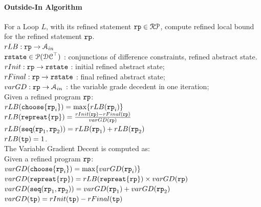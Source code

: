 \paragraph*{Outside-In Algorithm}
For a Loop $L$, with its refined statement $\mathtt{rp} \in \mathcal{RP}$,
compute refined local bound for the refined statement $\mathtt{rp}$.
\\
 $rLB: \mathtt{rp} \to \mathcal{A}_{in}$
\\
$\mathtt{rstate} \in \mathcal{P}(\mathcal{DC}^{\top})$ : conjunctions of difference constraints, refined abstract state.
\\
$rInit : \mathtt{rp} \to \mathtt{rstate} $ : initial refined abstract state;
\\
$rFinal : \mathtt{rp} \to \mathtt{rstate} $ : final refined abstract state;
\\
$varGD : \mathtt{rp} \to \mathcal{A}_{in}$ : the variable grade decedent in one iteration;
\\
Given a refined program $\mathtt{rp}$:
\\
$rLB(\mathtt{choose}\{\mathtt{rp}_i\}) =  \max\{rLB(\mathtt{rp}_i)\}$
\\
$rLB(\mathtt{repreat}\{\mathtt{rp}\}) =  \frac{rInit(\mathtt{rp}) - rFinal(\mathtt{rp})}{varGD(\mathtt{rp})}$
\\
$rLB(\mathtt{seq}(\mathtt{rp}_1, \mathtt{rp}_2)) =  rLB(\mathtt{rp}_1)+ rLB( \mathtt{rp}_2)$
\\
$rLB(\mathtt{tp}) =  1$.
\\
The Variable Gradient Decent is computed as:
\\
Given a refined program $\mathtt{rp}$:
\\
$varGD(\mathtt{choose}\{\mathtt{rp}_i\}) =  \max\{varGD(\mathtt{rp}_i)\}$
\\
$varGD(\mathtt{repreat}\{\mathtt{rp}\}) =  rLB(\mathtt{repreat}\{\mathtt{rp}\}) \times {varGD(\ensuremath{\mathtt{rp}})}$
\\
$varGD(\mathtt{seq}(\mathtt{rp}_1, \mathtt{rp}_2)) =  varGD(\mathtt{rp}_1)+ varGD( \mathtt{rp}_2)$
\\
$varGD(\mathtt{tp}) =  rInit(\mathtt{tp}) - rFinal(\mathtt{tp})$
%
